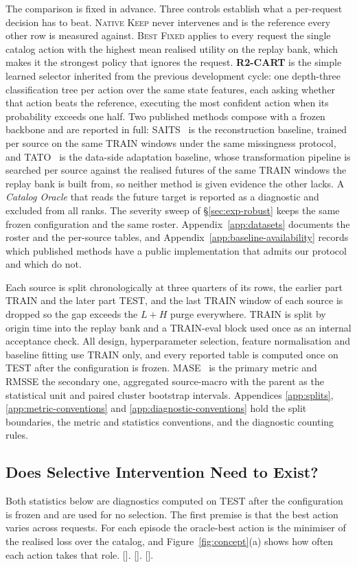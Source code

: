 \documentclass{article}
\newcommand{\ph}[1]{\textcolor{phgray}{\textsf{[\detokenize{#1}]}}}
\begin{document}
The comparison is fixed in advance. Three controls establish what a per-request decision has to
beat. \textsc{Native Keep} never intervenes and is the reference every other row is measured
against. \textsc{Best Fixed} applies to every request the single catalog action with the
highest mean realised utility on the replay bank, which makes it the strongest policy that
ignores the request. \textbf{R2-CART} is the simple learned selector inherited from the
previous development cycle: one depth-three classification tree per action over the same state
features, each asking whether that action beats the reference, executing the most confident
action when its probability exceeds one half. Two published methods compose with a frozen
backbone and are reported in full: SAITS~\citep{du2023saits,du2023pypots} is the
reconstruction baseline, trained per source on the same TRAIN windows under the same
missingness protocol, and TATO~\citep{qiu2026tato} is the data-side adaptation baseline, whose
transformation pipeline is searched per source against the realised futures of the same TRAIN
windows the replay bank is built from, so neither method is given evidence the other lacks. A
\emph{Catalog Oracle} that reads the future target is reported as a diagnostic and excluded
from all ranks.
The severity sweep of \S\ref{sec:exp-robust} keeps the same frozen configuration and the same
roster. Appendix~\ref{app:datasets} documents the roster and the per-source tables, and
Appendix~\ref{app:baseline-availability} records which published methods have a public
implementation that admits our protocol and which do not.

Each source is split chronologically at three quarters of its rows, the earlier part TRAIN and
the later part TEST, and the last TRAIN window of each source is dropped so the gap exceeds the
$L + H$ purge everywhere. TRAIN is split by origin time into the replay bank and a TRAIN-eval
block used once as an internal acceptance check. All design, hyperparameter selection, feature
normalisation and baseline fitting use TRAIN only, and every reported table is computed once on
TEST after the configuration is frozen. MASE~\citep{hyndman2006mase} is the primary metric and
RMSSE the secondary one, aggregated source-macro with the parent as the statistical unit and
paired cluster bootstrap intervals. Appendices \ref{app:splits},
\ref{app:metric-conventions} and \ref{app:diagnostic-conventions} hold the split boundaries,
the metric and statistics conventions, and the diagnostic counting rules.

\subsection{Does Selective Intervention Need to Exist?}
\label{sec:exp-exists}
Both statistics below are diagnostics computed on TEST after the configuration is frozen and
are used for no selection. The first premise is that the best action varies across requests.
For each episode the oracle-best action is the minimiser of the realised loss over the catalog,
and Figure~\ref{fig:concept}(a) shows how often each action takes that role. \ph{MAIN_HET_SHARES}. \ph{MAIN_HET_GAP}. \ph{MAIN_FIXED_ORACLE_GAP}.
\end{document}
